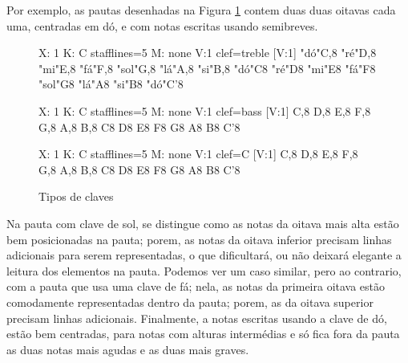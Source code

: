 Por exemplo, as pautas desenhadas na Figura \ref{fig:allnotesclaves} 
contem duas duas oitavas cada uma, centradas em dó, e com notas escritas usando semibreves.
\begin{figure}[h]
    \centering
\begin{abc}[name=abc-clavenotessol]
%
X: 1 %
K: C stafflines=5 %
M: none %
V:1 clef=treble %
%
[V:1] "dó"C,8 "ré"D,8 "mi"E,8 "fá"F,8  "sol"G,8 "lá"A,8 "si"B,8 "dó"C8 "ré"D8 "mi"E8 "fá"F8  "sol"G8 "lá"A8 "si"B8 "dó"C'8 
\end{abc}

\begin{abc}[name=abc-clavenotesfa]
%
X: 1 %
K: C stafflines=5 %
M: none %
V:1 clef=bass %
%
[V:1] C,8 D,8 E,8 F,8 G,8 A,8 B,8 C8 D8 E8 F8 G8 A8 B8 C'8 
\end{abc}

\begin{abc}[name=abc-clavenotesdo]
%
X: 1 %
K: C stafflines=5 %
M: none %
V:1 clef=C %
%
[V:1] C,8 D,8 E,8 F,8 G,8 A,8 B,8 C8 D8 E8 F8 G8 A8 B8 C'8 
\end{abc}
    \caption{Tipos de claves}\label{fig:allnotesclaves}
\end{figure}
Na pauta com clave de sol, 
se distingue como as notas da oitava mais alta estão bem posicionadas na pauta;
porem, as notas da oitava inferior precisam linhas adicionais para serem representadas,
o que dificultará, ou não deixará elegante a leitura dos elementos na pauta.
Podemos ver um caso similar, pero ao contrario, com a pauta que usa uma clave de fá;
nela, as notas da primeira oitava estão comodamente representadas dentro da pauta;
porem, as da oitava superior precisam linhas adicionais.
Finalmente, a notas escritas usando a clave de dó, estão bem centradas,
para notas com alturas intermédias e só fica fora da pauta as duas notas mais agudas e as duas mais graves.

